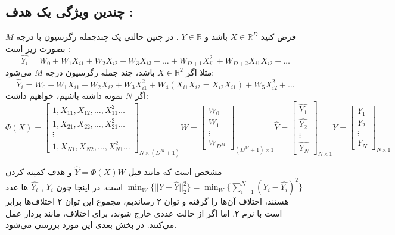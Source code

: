 \documentclass[a4paper, 12pt]{article}
\begin{document}
\subsection*{
	چندین ویژگی یک هدف :
}
فرض کنید
$X \in \mathbb{R}^D$
باشد و 
$Y \in \mathbb{R}$
. در چنین حالتی یک چندجمله رگرسیون با درجه $M$ بصورت زیر است :
\[
\hat{Y_i} = W_0 + W_1X_{i1} + W_2X_{i2} + W_3 X_{i3} + \dots + W_{D+1} X_{i1}^2 + W_{D+2}X_{i1}X_{i2} + \dots  
\]
مثلا اگر 
$X\in \mathbb{R}^2$
باشد، چند جمله رگرسیون درجه 
$M$
می‌شود:
\[
\hat{Y_i} = W_0 + W_1X_{i1} + W_2X_{i2} + W_3X_{i1}^2 + W_4(X_{i1}X_{i2} = X_{i2}X_{i1}) + W_5X_{i2}^2 + \dots 
\]
اگر 
$N$
نمونه داشته باشیم، خواهیم داشت:
\[
\Phi(X) = \begin{bmatrix}
	1,X_{11},X_{12},\dots,X_{11}^2\dots\\
	1,X_{21},X_{22},\dots,X_{21}^2\dots \\
	\vdots\\
	1,X_{N1},X_{N2},\dots,X_{N1}^2\dots
\end{bmatrix}_{N\times (D^M+1)}
W = \begin{bmatrix}
	W_0\\W_1\\\vdots\\W_{D^M}
\end{bmatrix}_{(D^M + 1) \times 1}
\hat{Y} = \begin{bmatrix}
	\hat{Y_1}\\\hat{Y_2}\\\vdots\\\hat{Y_N}
\end{bmatrix}_{N\times 1}
Y = \begin{bmatrix}
	Y_1\\Y_2\\\vdots\\Y_N
\end{bmatrix}_{N\times 1}
\]

مشخص است که مانند قیل 
$\hat{Y} = \Phi(X)W$
و هدف کمینه کردن 
$\min_W\{||Y-\hat{Y}||_2^2\} = \min_W \{\sum\limits_{i=1}^{N}(Y_i - \hat{Y_i})^2\}$
است. 
در اینجا چون 
$Y_i$
,
$\hat{Y_i}$
ها عدد هستند، اختلاف آن‌ها را گرفته و توان ۲ رساندیم، مجموع این توان ۲ اختلاف‌ها برابر است با نرم ۲. اما اگر 
از حالت عددی خارج شوند، برای اختلاف، مانند بردار عمل می‌کنند. در بخش بعدی این مورد بررسی می‌شود.
\end{document}
